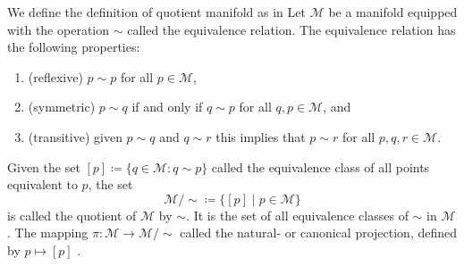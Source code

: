 \begin{definition}\label{def:quotient_manifold}
    We define the definition of quotient manifold as in \cite[p.~27]{AbsilMahonySepulchre2008} Let $\mathcal{M}$ be a manifold equipped with the operation $\sim$ called the \textup{equivalence relation}. The equivalence relation has the following properties:
    \begin{enumerate}
        \item (reflexive) $p\sim p$ for all $p\in \mathcal{M}$,
        \item (symmetric) $p \sim q$ if and only if $q\sim p$ for all $q,p\in \mathcal{M}$, and
        \item (transitive) given $p\sim q$ and $q\sim r$ this implies that $p\sim r$ for all $p,q,r\in \mathcal{M}$.
    \end{enumerate}
    Given the set $[p]\coloneqq \{q\in \mathcal{M}:q\sim p\}$ called the \textup{equivalence class} of all points equivalent to $p$, the set
    \begin{equation*}
        \mathcal{M}/\sim \coloneqq \{[p] \;|\; p\in \mathcal{M}\}
    \end{equation*}
    is called the \textup{quotient of }$\mathcal{M}$\textup{ by }$\sim$. It is the set of all equivalence classes of $\sim$ in $\mathcal{M}$. The mapping $\pi:\mathcal{M}\xrightarrow{}\mathcal{M}/\sim$ called the \textup{natural-} or \textup{canonical projection}, defined by $p\mapsto[p]$ . 
\end{definition}

